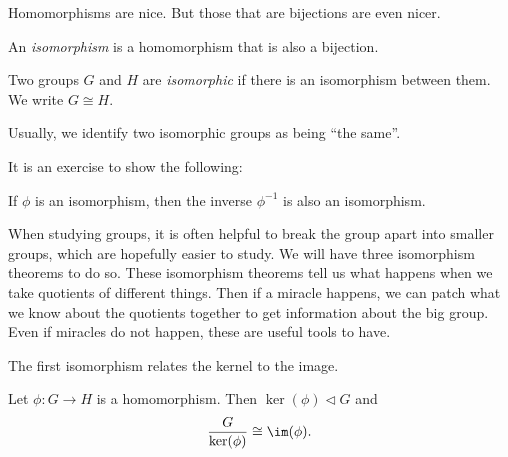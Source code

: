\documentclass[a4paper]{article}
\begin{document}
Homomorphisms are nice. But those that are bijections are even nicer.
\begin{defi}[Isomorphism]
  An \emph{isomorphism} is a homomorphism that is also a bijection.
\end{defi}

\begin{defi}
  Two groups $G$ and $H$ are \emph{isomorphic} if there is an isomorphism between them. We write $G \cong H$.
\end{defi}
Usually, we identify two isomorphic groups as being ``the same''.

It is an exercise to show the following:
\begin{lemma}
  If $\phi$ is an isomorphism, then the inverse $\phi^{-1}$ is also an isomorphism.
\end{lemma}

When studying groups, it is often helpful to break the group apart into smaller groups, which are hopefully easier to study. We will have three isomorphism theorems to do so. These isomorphism theorems tell us what happens when we take quotients of different things. Then if a miracle happens, we can patch what we know about the quotients together to get information about the big group. Even if miracles do not happen, these are useful tools to have.

The first isomorphism relates the kernel to the image.
\begin{thm}
  Let $\phi: G \to H$ is a homomorphism. Then $\ker(\phi) \lhd G$ and
  \[
    \frac{G}{\ker (\phi)} \cong \im (\phi).
  \]
\end{thm}
\end{document}
